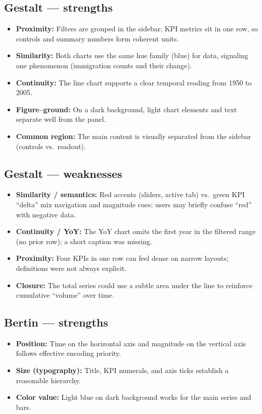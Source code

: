 \documentclass[11pt,a4paper]{article}
\begin{document}
\subsection{Gestalt --- strengths}
\begin{itemize}[leftmargin=*]
  \item \textbf{Proximity:} Filters are grouped in the sidebar; KPI metrics sit in one row, so controls and summary numbers form coherent units.
  \item \textbf{Similarity:} Both charts use the same hue family (blue) for data, signaling one phenomenon (immigration counts and their change).
  \item \textbf{Continuity:} The line chart supports a clear temporal reading from 1950 to 2005.
  \item \textbf{Figure--ground:} On a dark background, light chart elements and text separate well from the panel.
  \item \textbf{Common region:} The main content is visually separated from the sidebar (controls vs.\ readout).
\end{itemize}

\subsection{Gestalt --- weaknesses}
\begin{itemize}[leftmargin=*]
  \item \textbf{Similarity / semantics:} Red accents (sliders, active tab) vs.\ green KPI ``delta'' mix navigation and magnitude cues; users may briefly confuse ``red'' with negative data.
  \item \textbf{Continuity / YoY:} The YoY chart omits the first year in the filtered range (no prior row); a short caption was missing.
  \item \textbf{Proximity:} Four KPIs in one row can feel dense on narrow layouts; definitions were not always explicit.
  \item \textbf{Closure:} The total series could use a subtle area under the line to reinforce cumulative ``volume'' over time.
\end{itemize}

\subsection{Bertin --- strengths}
\begin{itemize}[leftmargin=*]
  \item \textbf{Position:} Time on the horizontal axis and magnitude on the vertical axis follows effective encoding priority.
  \item \textbf{Size (typography):} Title, KPI numerals, and axis ticks establish a reasonable hierarchy.
  \item \textbf{Color value:} Light blue on dark background works for the main series and bars.
\end{itemize}
\end{document}

